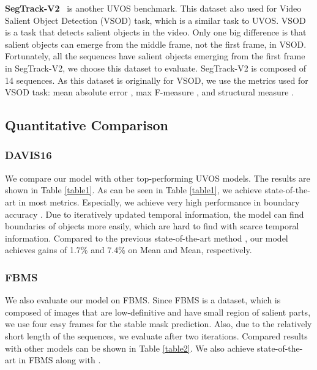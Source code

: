 \documentclass[letterpaper]{article} \usepackage{aaai22}  \usepackage{times}  \usepackage{helvet}  \usepackage{courier}  \usepackage[hyphens]{url}  \usepackage{graphicx} \urlstyle{rm} \def\UrlFont{\rm}  \usepackage{natbib}  \usepackage{caption} \DeclareCaptionStyle{ruled}{labelfont=normalfont,labelsep=colon,strut=off} \frenchspacing  \setlength{\pdfpagewidth}{8.5in}  \setlength{\pdfpageheight}{11in}  \usepackage{algorithm}
\renewcommand{\paragraph}[1]{\vspace{1mm}\noindent\textbf{#1}}
\begin{document}
\paragraph{SegTrack-V2}~\citep{li2013video} is another UVOS benchmark.
This dataset also used for Video Salient Object Detection (VSOD) task, which is a similar task to UVOS. VSOD is a task that detects salient objects in the video. Only one big difference is that salient objects can emerge from the middle frame, not the first frame, in VSOD. Fortunately, all the sequences have salient objects emerging from the first frame in SegTrack-V2, we choose this dataset to evaluate. SegTrack-V2 is composed of 14 sequences. As this dataset is originally for VSOD, we use the metrics used for VSOD task: mean absolute error , max F-measure , and structural measure . 

\subsection{Quantitative Comparison}

\subsubsection{DAVIS16}

We compare our model with other top-performing UVOS models. The results are shown in Table \ref{table1}. As can be seen in Table \ref{table1}, we achieve state-of-the-art in most metrics. Especially, we achieve very high performance in boundary accuracy . Due to iteratively updated temporal information, the model can find boundaries of objects more easily, which are hard to find with scarce temporal information. Compared to the previous state-of-the-art method \citep{liu2020f2net}, our model achieves gains of 1.7\% and 7.4\% on  Mean and  Mean, respectively.

\subsubsection{FBMS}

We also evaluate our model on FBMS. Since FBMS is a dataset, which is composed of images that are low-definitive and have small region of salient parts, we use four easy frames for the stable mask prediction. Also, due to the relatively short length of the sequences, we evaluate after two iterations. Compared results with other models can be shown in Table \ref{table2}. We also achieve state-of-the-art in FBMS along with \citet{liu2020f2net}.
\end{document}
